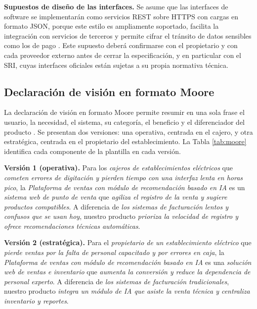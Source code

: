 \documentclass[onecolumn,12pt,a4paper]{IEEEtran}
\begin{document}
\textbf{Supuestos de dise\~no de las interfaces.} Se asume que las interfaces de software se implementar\'an como servicios REST sobre HTTPS con cargas en formato JSON, porque este estilo es ampliamente soportado, facilita la integraci\'on con servicios de terceros y permite cifrar el tr\'ansito de datos sensibles como los de pago \cite{iso29148,iso15288}. Este supuesto deber\'a confirmarse con el propietario y con cada proveedor externo antes de cerrar la especificaci\'on, y en particular con el SRI, cuyas interfaces oficiales est\'an sujetas a su propia normativa t\'ecnica.

\subsection{Declaraci\'on de visi\'on en formato Moore}
La declaraci\'on de visi\'on en formato Moore permite resumir en una sola frase el usuario, la necesidad, el sistema, su categor\'ia, el beneficio y el diferenciador del producto \cite{moore}. Se presentan dos versiones: una operativa, centrada en el cajero, y otra estrat\'egica, centrada en el propietario del establecimiento. La Tabla \ref{tab:moore} identifica cada componente de la plantilla en cada versi\'on.

\noindent\textbf{Versi\'on 1 (operativa).} Para los \emph{cajeros de establecimientos el\'ectricos} que \emph{cometen errores de digitaci\'on y pierden tiempo con una interfaz lenta en horas pico}, la \emph{Plataforma de ventas con m\'odulo de recomendaci\'on basado en IA} es un \emph{sistema web de punto de venta} que \emph{agiliza el registro de la venta y sugiere productos compatibles}. A diferencia de \emph{los sistemas de facturaci\'on lentos y confusos que se usan hoy}, nuestro producto \emph{prioriza la velocidad de registro y ofrece recomendaciones t\'ecnicas autom\'aticas}.

\noindent\textbf{Versi\'on 2 (estrat\'egica).} Para el \emph{propietario de un establecimiento el\'ectrico} que \emph{pierde ventas por la falta de personal capacitado y por errores en caja}, la \emph{Plataforma de ventas con m\'odulo de recomendaci\'on basado en IA} es una \emph{soluci\'on web de ventas e inventario} que \emph{aumenta la conversi\'on y reduce la dependencia de personal experto}. A diferencia de \emph{los sistemas de facturaci\'on tradicionales}, nuestro producto \emph{integra un m\'odulo de IA que asiste la venta t\'ecnica y centraliza inventario y reportes}.
\end{document}
